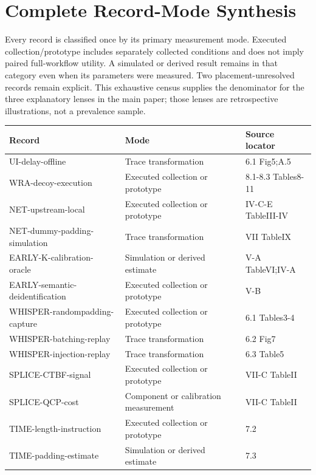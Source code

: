 \section{Complete Record-Mode Synthesis}\label{app:record-modes}
Every record is classified once by its primary measurement mode. Executed collection/prototype includes separately collected conditions and does not imply paired full-workflow utility. A simulated or derived result remains in that category even when its parameters were measured. Two placement-unresolved records remain explicit. This exhaustive census supplies the denominator for the three explanatory lenses in the main paper; those lenses are retrospective illustrations, not a prevalence sample.
\begin{longtable}{@{}p{}p{}p{}@{}}\toprule Record & Mode & Source locator\\\midrule\endhead
UI-delay-offline~\cite{uitraces2026} & Trace transformation & 6.1 Fig5;A.5\\
WRA-decoy-execution~\cite{jeong2026wra} & Executed collection or prototype & 8.1-8.3 Tables8-11\\
NET-upstream-local~\cite{netecho2025} & Executed collection or prototype & IV-C-E TableIII-IV\\
NET-dummy-padding-simulation~\cite{netecho2025} & Trace transformation & VII TableIX\\
EARLY-K-calibration-oracle~\cite{earlybird2025} & Simulation or derived estimate & V-A TableVI;IV-A\\
EARLY-semantic-deidentification~\cite{earlybird2025} & Executed collection or prototype & V-B\\
WHISPER-randompadding-capture~\cite{whisperleak2025} & Executed collection or prototype & 6.1 Tables3-4\\
WHISPER-batching-replay~\cite{whisperleak2025} & Trace transformation & 6.2 Fig7\\
WHISPER-injection-replay~\cite{whisperleak2025} & Trace transformation & 6.3 Table5\\
SPLICE-CTBF-signal~\cite{spliceleak2026} & Executed collection or prototype & VII-C TableII\\
SPLICE-QCP-cost~\cite{spliceleak2026} & Component or calibration measurement & VII-C TableII\\
TIME-length-instruction~\cite{timewilltell2024} & Executed collection or prototype & 7.2\\
TIME-padding-estimate~\cite{timewilltell2024} & Simulation or derived estimate & 7.3\\

\end{longtable}
